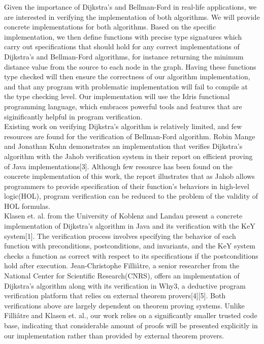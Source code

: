 \documentclass[11pt, a4paper]{article} %
\theoremstyle{definition}
\begin{document}
Given the importance of Dijkstra's and Bellman-Ford in real-life applications, we are interested in verifying the implementation of both algorithms. We will provide concrete implementations for both algorithms. Based on the specific implementation, we then define functions with precise type signatures which carry out specifications that should hold for any correct implementations of Dijkstra's and Bellman-Ford algorithms, for instance returning the minimum distance value from the source to each node in the graph. Having these functions type checked will then ensure the correctness of our algorithm implementation, and that any program with problematic implementation will fail to compile at the type checking level. Our implementation will use the Idris functional programming language, which embraces powerful tools and features that are siginificantly helpful in program verification.
\\

Existing work on verifying Dijkstra's algorithm is relatively limited, and few resources are found for the verification of Bellman-Ford algorithm. Robin Mange and Jonathan Kuhn demonstrates an implementation that verifies Dijkstra's algorithm with the Jahob verification system in their report on efficient proving of Java implementations[3]. Although few resource has been found on the concrete implementation of this work, the report illustrates that as Jahob allows programmers to provide specification of their function's behaviors in high-level logic(HOL), program verification can be reduced to the problem of the validity of HOL formulas. 
\\

Klasen et. al. from the University of Koblenz and Landau present a concrete implementation of Dijkstra's algorithm in Java and its verification with the KeY system[1]. The verification process involves specifying the behavior of each function with preconditions, postconditions, and invariants, and the KeY system checks a function as correct with respect to its specifications if the postconditions hold after execution. Jean-Christophe Filliâtre, a senior researcher from the National Center for Scientific Research(CNRS), offers an implementation of Dijkstra's algorithm along with its verification in Why3, a deductive program verification platform that relies on external theorem provers[4][5]. Both verifications above are largely dependent on theorem proving systems. Unlike Filliâtre and Klasen et. al., our work relies on a significantly smaller trusted code base, indicating that considerable amount of proofs will be presented explicitly in our implementation rather than provided by external theorem provers.
\end{document}
